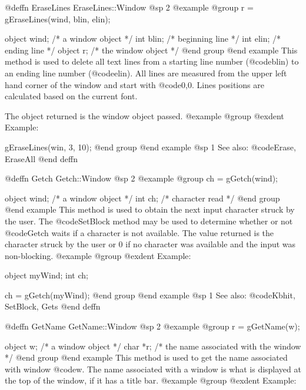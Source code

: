 @deffn {EraseLines} EraseLines::Window
@sp 2
@example
@group
r = gEraseLines(wind, blin, elin);

object  wind;   /*  a window object     */
int     blin;   /*  beginning line      */
int     elin;   /*  ending line         */
object  r;      /*  the window object   */
@end group
@end example
This method is used to delete all text lines from a starting line number
(@code{blin}) to an ending line number (@code{elin}). All lines are
measured from the upper left hand corner of the window and start with
@code{0,0}.  Lines positions are calculated based on the current font.

The object returned is the window object passed.
@example
@group
@exdent Example:

gEraseLines(win, 3, 10);
@end group
@end example
@sp 1
See also:  @code{Erase, EraseAll}
@end deffn









@deffn {Getch} Getch::Window
@sp 2
@example
@group
ch = gGetch(wind);

object  wind;   /*  a window object   */
int     ch;     /*  character read    */
@end group
@end example
This method is used to obtain the next input character struck by the
user.  The @code{SetBlock} method may be used to determine whether or not
@code{Getch} waits if a character is not available.  The value returned
is the character struck by the user or 0 if no character was available
and the input was non-blocking.
@example
@group
@exdent Example:

object  myWind;
int     ch;

ch = gGetch(myWind);
@end group
@end example
@sp 1
See also:  @code{Kbhit, SetBlock, Gets}
@end deffn
















@deffn {GetName} GetName::Window
@sp 2
@example
@group
r = gGetName(w);

object  w;      /*  a window object     */
char   *r;      /*  the name associated with the window   */
@end group
@end example
This method is used to get the name associated with window @code{w}.
The name associated with a window is what is displayed at the top of the
window, if it has a title bar. 
@example
@group
@exdent Example:

